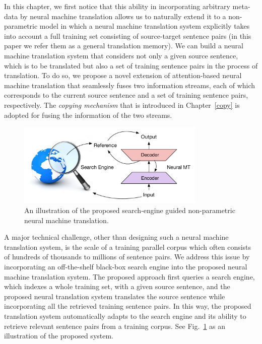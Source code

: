 In this chapter, we first notice that this ability in incorporating arbitrary meta-data by neural machine translation allows us to naturally extend it to a non-parametric
model in which a neural machine translation system explicitly takes into account a full training set consisting of source-target sentence pairs (in this paper we refer them as a general translation memory). We can build a neural machine translation system that considers not only a given source sentence, which is to be translated but also a set of training sentence pairs in the process of translation. To do so, we propose a novel extension of attention-based neural machine translation that seamlessly fuses two information streams, each of which corresponds to the current source sentence and a set of training sentence pairs, respectively. The \textit{copying mechanism} that is introduced in Chapter~\ref{copy} is adopted for fusing the information of the two streams.  
\begin{figure}[t]
	\centering
	\includegraphics[width=0.8\textwidth]{figs/seg/picture}
	\caption{\label{cp4.fig.illustration}An illustration of the proposed search-engine guided non-parametric neural machine  translation.}
\end{figure}

A major technical challenge, other than designing such a neural machine translation system, is the scale of a training parallel corpus which often consists of hundreds of thousands to millions of sentence pairs. We address this issue by incorporating an off-the-shelf black-box search engine into the proposed neural machine translation system. The proposed approach first queries a search engine, which indexes a whole training set, with a given source sentence, and the proposed neural translation system translates the source sentence while incorporating all the retrieved training sentence pairs. In this way, the proposed translation system automatically adapts to the search engine and its ability to retrieve relevant sentence pairs from a training corpus. See Fig.~\ref{cp4.fig.illustration} as an illustration of the proposed system.

